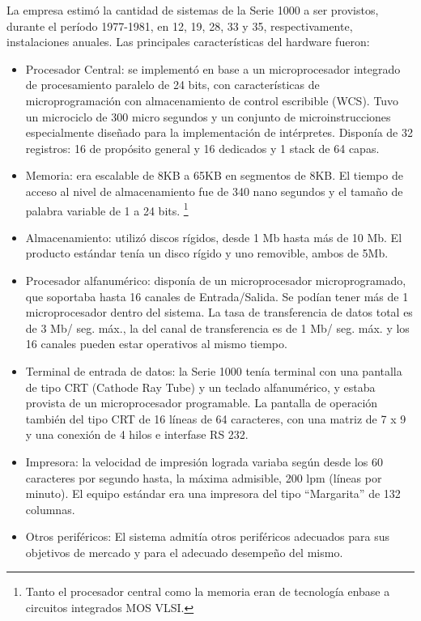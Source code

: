 \documentclass[%
 	final,
%
	notitlepage,
	narroweqnarray,
	inline,
 	twoside,
	]{ieee}
\begin{document}
La empresa estim\'o la cantidad de sistemas de la Serie 1000 a ser provistos, durante el per\'iodo 1977-1981, en 12, 19, 28, 33 y 35,
respectivamente, instalaciones anuales.
Las principales caracter\'isticas del hardware fueron:
\begin{itemize}
\item Procesador Central: se implement\'o en base a un microprocesador integrado de procesamiento paralelo de 24 bits, con caracter\'isticas de microprogramaci\'on con almacenamiento de control escribible (WCS). Tuvo un microciclo de 300 micro segundos y un conjunto de microinstrucciones especialmente dise\~nado para la implementaci\'on de int\'erpretes. Dispon\'ia de 32 registros: 16 de prop\'osito general y 16 dedicados y 1 stack de 64 capas.
\item Memoria: era escalable de 8KB a 65KB en segmentos de 8KB. El tiempo de acceso al nivel de almacenamiento fue de 340 nano segundos y el tama\~no de palabra variable de 1 a 24 bits.
\footnote{Tanto el procesador central como la memoria eran de tecnolog\'ia enbase a circuitos integrados MOS VLSI.}
\item Almacenamiento: utiliz\'o discos r\'igidos, desde 1 Mb hasta m\'as de 10 Mb. El producto est\'andar ten\'ia un disco r\'igido y uno removible, ambos de 5Mb.
\item Procesador alfanum\'erico: dispon\'ia de un microprocesador microprogramado, que soportaba hasta 16 canales de Entrada/Salida. Se pod\'ian tener m\'as de 1 microprocesador dentro del sistema. La tasa de transferencia de datos total es de 3 Mb/ seg. m\'ax., la del canal de transferencia es de 1 Mb/ seg. m\'ax. y los 16 canales pueden estar operativos al mismo tiempo.
\item Terminal de entrada de datos: la Serie 1000 ten\'ia terminal con una pantalla de tipo CRT (Cathode Ray Tube) y un teclado alfanum\'erico, y estaba provista de un microprocesador programable. La pantalla de operaci\'on tambi\'en del tipo CRT de 16 l\'ineas de 64 caracteres, con una matriz de 7 x 9 y una conexi\'on de 4 hilos e interfase RS 232.
\item Impresora: la velocidad de impresi\'on lograda variaba seg\'un desde los 60 caracteres por segundo hasta, la m\'axima admisible, 200 lpm (l\'ineas por minuto). El equipo est\'andar era una impresora del tipo ``Margarita'' de 132 columnas.
\item Otros perif\'ericos: El sistema admit\'ia otros perif\'ericos adecuados para sus objetivos de mercado y para el adecuado desempe\~no del mismo.
\end{itemize}
\end{document}

